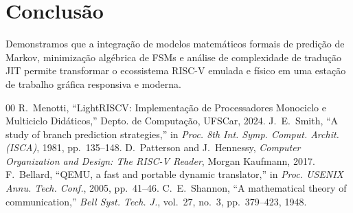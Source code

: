 \documentclass[10pt,twocolumn]{article}
\begin{document}
\section{Conclus\~ao}
Demonstramos que a integra\c{c}\~ao de modelos matem\'aticos formais de predi\c{c}\~ao de Markov, minimiza\c{c}\~ao alg\'ebrica de FSMs e an\'alise de complexidade de tradu\c{c}\~ao JIT permite transformar o ecossistema RISC-V emulada e f\'isico em uma esta\c{c}\~ao de trabalho gr\'afica responsiva e moderna.

\begin{thebibliography}{00}
 R.~Menotti, ``LightRISCV: Implementa\c{c}\~ao de Processadores Monociclo e Multiciclo Did\'aticos,'' Depto. de Computa\c{c}\~ao, UFSCar, 2024.
 J.~E.~Smith, ``A study of branch prediction strategies,'' in \emph{Proc. 8th Int. Symp. Comput. Archit. (ISCA)}, 1981, pp.~135--148.
 D.~Patterson and J.~Hennessy, \emph{Computer Organization and Design: The RISC-V Reader}, Morgan Kaufmann, 2017.
 F.~Bellard, ``QEMU, a fast and portable dynamic translator,'' in \emph{Proc. USENIX Annu. Tech. Conf.}, 2005, pp.~41--46.
 C.~E.~Shannon, ``A mathematical theory of communication,'' \emph{Bell Syst. Tech. J.}, vol.~27, no.~3, pp.~379--423, 1948.
\end{thebibliography}
\end{document}
